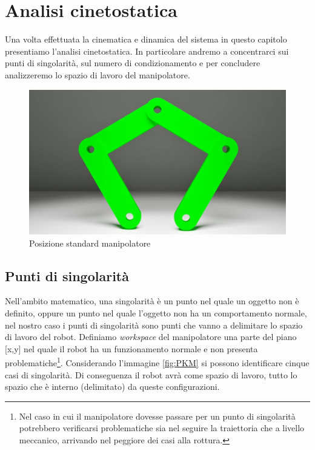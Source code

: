 \section{Analisi cinetostatica}
Una volta effettuata la cinematica e dinamica del sistema in questo capitolo presentiamo l'analisi cinetostatica. In particolare andremo a concentrarci sui punti di singolarità, sul numero di condizionamento e per concludere analizzeremo lo spazio di lavoro del manipolatore.
\begin{figure}[ht]
	\begin{center}
		\includegraphics[scale=0.4]{Immagini/Singolarity/0}
		\caption{Posizione standard manipolatore}
	\end{center}
\end{figure}
\subsection{Punti di singolarità}
Nell'ambito matematico, una singolarità è un punto nel quale un oggetto non è definito, oppure un punto nel quale l'oggetto non ha un comportamento normale, nel nostro caso i punti di singolarità sono punti che vanno a delimitare lo spazio di lavoro del robot. Definiamo \textit{workspace} del manipolatore una parte del piano [x,y] nel quale il robot ha un funzionamento normale e non presenta problematiche\footnote{Nel caso in cui il manipolatore dovesse passare per un punto di singolarità potrebbero verificarsi problematiche sia nel seguire la traiettoria che a livello meccanico, arrivando nel peggiore dei casi alla rottura.}. Considerando l'immagine \ref{fig:PKM} si possono identificare cinque casi di singolarità. Di conseguenza il robot avrà come spazio di lavoro, tutto lo spazio che è interno (delimitato) da queste configurazioni.
